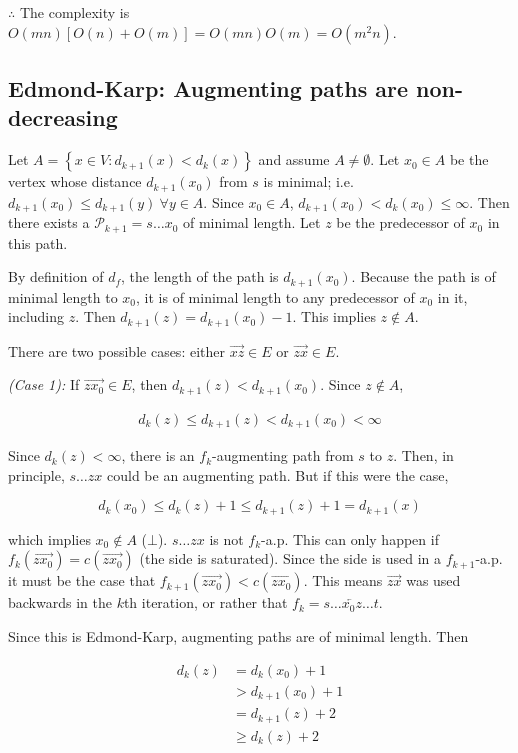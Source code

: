 $\therefore $ The complexity is $O(mn) \left[ O(n) + O(m) \right] = O(mn)O(m) = O(m^2n) $.


\pagebreak 

\subsection{Edmond-Karp: Augmenting paths are non-decreasing}

Let $A = \left\{ x \in V : d_{k+1}(x) < d_k(x) \right\} $ and
assume $A \neq \emptyset$. Let $x_0 \in A$ be the vertex whose distance
$d_{k+1}(x_0)$ from $s$ is minimal; i.e. $d_{k+1}(x_0) \leq d_{k+1}(y) ~
\forall y \in A$. Since $x_0 \in A$, $d_{k+1}(x_0) < d_k(x_0) \leq \infty$.
Then there exists a $\mathcal{P}_{k+1} = s \ldots x_0$ of minimal length.
Let $z$ be the predecessor of $x_0$ in this path.

By definition of $d_f$, the length of the path is $d_{k+1}(x_0)$. Because the
path is of minimal length to $x_0$, it is of minimal length to any predecessor
of $x_0$ in it, including $z$. Then $d_{k+1}(z) = d_{k+1}(x_0) - 1$. This
implies $z \not\in A$.

There are two possible cases: either $\overrightarrow{xz} \in E$
or $\overrightarrow{zx} \in E$.

\textit{(Case 1):} If $\overrightarrow{zx_0} \in E$, then
$d_{k+1}(z) < d_{k+1}(x_0)$. Since $z \not\in A$,

\begin{align*}
    d_k(z) \leq d_{k+1}(z) < d_{k+1}(x_0) < \infty
\end{align*}

Since $d_k(z) < \infty$, there is an $f_{k}$-augmenting path from $s$ to $z$.
Then, in principle, $s \ldots z x$ could be  an augmenting path. But
if this were the case, 

$$d_k(x_0) \leq d_k(z) + 1 \leq d_{k+1}(z) + 1 = d_{k+1}(x)$$ 

which implies $x_0 \not\in A$ ($\bot$). $s\ldots zx$ is not $f_k$-a.p. This can
only happen if $f_k(\overrightarrow{zx_0}) = c(\overrightarrow{zx_0})$ (the
side is saturated). Since the side is used in a $f_{k+1}$-a.p. it must be the
case that $f_{k+1}(\overrightarrow{zx_0}) < c(\overrightarrow{zx_0})$. This
means $\overrightarrow{zx}$ was used backwards in the $k$th iteration, or
rather that $f_k = s \ldots \overleftarrow{x_0z} \ldots t$.

Since this is Edmond-Karp, augmenting paths are of minimal length. Then 

\begin{align*}
    d_{k}(z) &= d_k(x_0) + 1   \\ 
             &> d_{k+1}(x_0) + 1 \\ 
             &=d_{k+1}(z) + 2 \\ 
             & \geq d_{k}(z) + 2
\end{align*}


